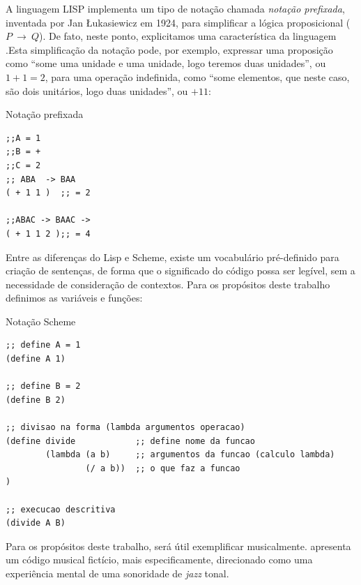 A linguagem LISP implementa um tipo de notação chamada \emph{notação prefixada}, inventada por Jan Łukasiewicz em 1924, para simplificar a lógica proposicional ($P~\to~Q$). De fato, neste ponto, explicitamos uma característica da linguagem .Esta simplificação da notação pode, por exemplo, expressar uma proposição como  ``some uma unidade e uma unidade, logo teremos duas unidades'',  ou $1+1=2$, para uma operação indefinida, como ``some elementos, que neste caso, são dois unitários, logo duas unidades'', ou $+ 1 1$:

\begin{example}{Notação prefixada}
\begin{verbatim}
;;A = 1
;;B = +
;;C = 2
;; ABA  -> BAA
( + 1 1 )  ;; = 2

;;ABAC -> BAAC -> 
( + 1 1 2 );; = 4
\end{verbatim}
\end{example}

Entre as diferenças do Lisp e Scheme, existe um vocabulário pré-definido para criação de sentenças, de forma que o significado do código possa ser legível, sem a necessidade de consideração de contextos. Para os propósitos deste trabalho definimos as variáveis e funções:

\begin{example}{Notação Scheme}
\begin{verbatim}
;; define A = 1
(define A 1)

;; define B = 2
(define B 2)

;; divisao na forma (lambda argumentos operacao) 
(define divide            ;; define nome da funcao
        (lambda (a b)     ;; argumentos da funcao (calculo lambda)
                (/ a b))  ;; o que faz a funcao
)

;; execucao descritiva
(divide A B)
\end{verbatim}
\end{example}

Para os propósitos deste trabalho, será útil exemplificar musicalmente.  apresenta um código musical fictício, mais especificamente, direcionado como uma experiência mental de uma sonoridade de \emph{jazz} tonal. 

